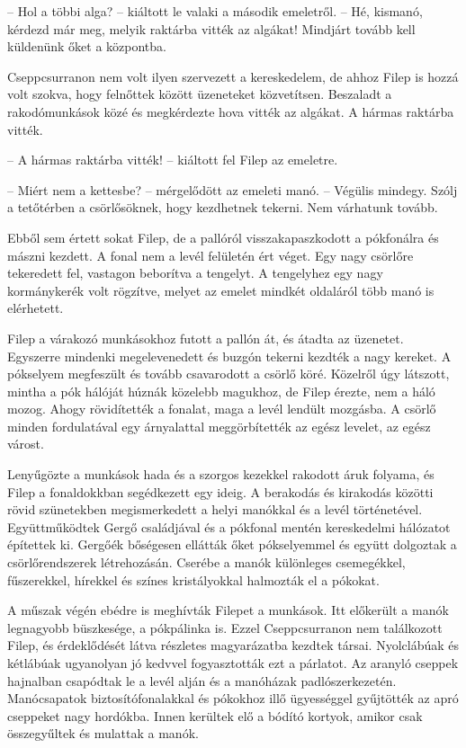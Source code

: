 \documentclass[10pt]{memoir}
\begin{document}
-- Hol a többi alga? -- kiáltott le valaki a második emeletről. -- Hé,
kismanó, kérdezd már meg, melyik raktárba vitték az algákat! Mindjárt tovább
kell küldenünk őket a központba.

Cseppcsurranon nem volt ilyen szervezett a kereskedelem, de ahhoz Filep is
hozzá volt szokva, hogy felnőttek között üzeneteket közvetítsen. Beszaladt a
rakodómunkások közé és megkérdezte hova vitték az algákat. A hármas raktárba
vitték.

-- A hármas raktárba vitték! -- kiáltott fel Filep az emeletre.

-- Miért nem a kettesbe? -- mérgelődött az emeleti manó. -- Végülis mindegy.
Szólj a tetőtérben a csörlősöknek, hogy kezdhetnek tekerni. Nem várhatunk
tovább.

Ebből sem értett sokat Filep, de a pallóról visszakapaszkodott a pókfonálra és
mászni kezdett. A fonal nem a levél felületén ért véget. Egy nagy csörlőre
tekeredett fel, vastagon beborítva a tengelyt. A tengelyhez egy nagy
kormánykerék volt rögzítve, melyet az emelet mindkét oldaláról több manó is
elérhetett.

Filep a várakozó munkásokhoz futott a pallón át, és átadta az üzenetet.
Egyszerre mindenki megelevenedett és buzgón tekerni kezdték a nagy kereket. A
pókselyem megfeszült és tovább csavarodott a csörlő köré. Közelről úgy
látszott, mintha a pók hálóját húznák közelebb magukhoz, de Filep érezte, nem a
háló mozog. Ahogy rövidítették a fonalat, maga a levél lendült mozgásba. A
csörlő minden fordulatával egy árnyalattal meggörbítették az egész levelet, az
egész várost.

Lenyűgözte a munkások hada és a szorgos kezekkel rakodott áruk folyama, és
Filep a fonaldokkban segédkezett egy ideig. A berakodás és kirakodás közötti
rövid szünetekben megismerkedett a helyi manókkal és a levél történetével.
Együttműködtek Gergő családjával és a pókfonal mentén kereskedelmi hálózatot
építettek ki. Gergőék bőségesen ellátták őket pókselyemmel és együtt dolgoztak
a csörlőrendszerek létrehozásán. Cserébe a manók különleges csemegékkel,
fűszerekkel, hírekkel és színes kristályokkal halmozták el a pókokat.

A műszak végén ebédre is meghívták Filepet a munkások. Itt előkerült a manók
legnagyobb büszkesége, a pókpálinka is. Ezzel Cseppcsurranon nem találkozott
Filep, és érdeklődését látva részletes magyarázatba kezdtek társai. Nyolclábúak
és kétlábúak ugyanolyan jó kedvvel fogyasztották ezt a párlatot. Az aranyló
cseppek hajnalban csapódtak le a levél alján és a manóházak padlószerkezetén.
Manócsapatok biztosítófonalakkal és pókokhoz illő ügyességgel gyűjtötték az
apró cseppeket nagy hordókba. Innen kerültek elő a bódító kortyok, amikor csak
összegyűltek és mulattak a manók.
\end{document}
